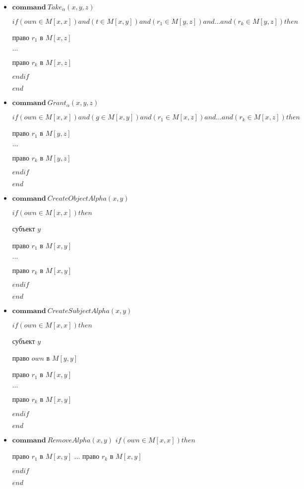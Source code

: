 \begin{multicols}{2}
	\begin{itemize}
		\item $\mathbf{command} \  Take_{\alpha}(x,y,z)$

		$if (own \in M[x,x]) and (t \in M[x,y])and (r_1 \in M[y,z])and  \ldots and (r_k \in M[y,z]) then $

		 право $r_1$ в $M[x,z]$

		$\ldots$

		 право $r_k$ в $M[x,z]$

		$endif$

		$end$

		\item 		$\mathbf{command} \  Grant_{\alpha}(x,y,z)$

				$if (own \in M[x,x]) and (g \in M[x,y])and (r_1 \in M[x,z])and  \ldots and (r_k \in M[x,z]) then $

				 право $r_1$ в $M[y,z]$

				$\ldots$

				 право $r_k$ в $M[y,z]$

				$endif$

				$end$
		\end{itemize}
		\begin{itemize}
		\item 		$\mathbf{command} \ CreateObjectAlpha(x,y)$

				$if (own \in M[x,x]) then $

				 субъект $y$

				 право $r_1$ в $M[x,y]$

				$\ldots$

				 право $r_k$ в $M[x,y]$

				$endif$

				$end$

		\item 		$\mathbf{command} \ CreateSubjectAlpha(x,y)$

				$if (own \in M[x,x]) then $

				 субъект $y$

				 право $own$ в $M[y,y]$

				 право $r_1$ в $M[x,y]$

				$\ldots$

				 право $r_k$ в $M[x,y]$

				$endif$

				$end$
			\end{itemize}
			\begin{itemize}

			\item 		$\mathbf{command} \ RemoveAlpha(x,y)$
					$if (own \in M[x,x]) then $

					 право $r_1$ в $M[x,y]$
					$\ldots$
					 право $r_k$ в $M[x,y]$

					$endif$

					$end$

	\end{itemize}

\end{multicols}


